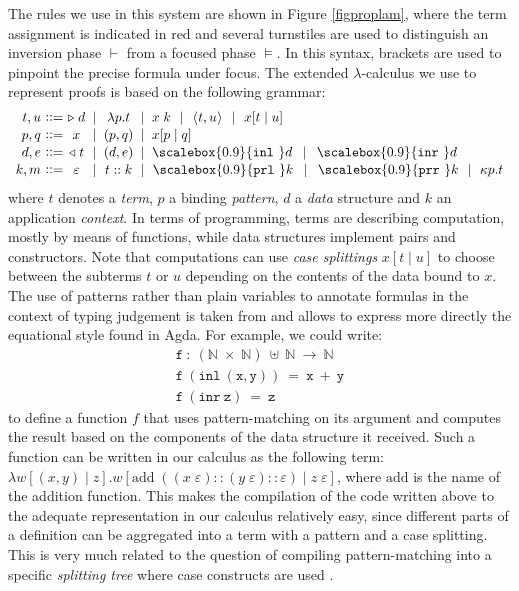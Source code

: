 \documentclass[creativecommons]{eptcs/eptcs}
\newcommand{\grdef}[0]{\mathrel{\raise.5pt\hbox{$\mathop{::}$}{=}}}
\newcommand{\mmid}{\:\mid\:}
\newcommand{\pr}[1]{\langle\hspace*{0.1ex}#1\hspace*{0.1ex}\rangle}
\newcommand{\don}[0]{\mathord{\triangleright\;}}
\newcommand{\nod}[0]{\mathord{\triangleleft\;}}
\newcommand{\els}[0]{\varepsilon}
\newcommand{\inl}[0]{\mathord{\scalebox{0.9}{\texttt{inl\,\,}}}\xspace}
\newcommand{\inr}[0]{\mathord{\scalebox{0.9}{\texttt{inr\,\,}}}\xspace}
\newcommand{\prl}[0]{\mathord{\scalebox{0.9}{\texttt{prl\,\,}}}\xspace}
\newcommand{\prr}[0]{\mathord{\scalebox{0.9}{\texttt{prr\,\,}}}\xspace}
\newcommand{\spt}[3]{#1[#2 \mid #3]}
\newcommand{\imp}[0]{\rightarrow\xspace}
\begin{document}
The rules we use in this system are shown in Figure \ref{figproplam}, where
the term assignment is indicated in red and several turnstiles are used to
distinguish an inversion phase $\vdash$ from a focused phase $\vDash$. In this
syntax, brackets are used to pinpoint the precise formula under focus. The
extended $\lambda$-calculus we use to represent proofs is based on the
following grammar:
$$\begin{array}{r@{~\grdef~}c@{~\mmid~}c@{~\mmid~}l}
  t,u & \don d & \lambda p.t & x\;k \,\mmid\, \pr{t,u}
    \,\mmid\, \spt{x}{t}{u} \\[0.1em]
  p,q & x & (p,q) & \spt{x}{p}{q} \\[0.1em]
  d,e & \nod t & (d,e) & \inl d \;\mmid\; \inr d \\[0.1em]
  k,m & \els & t::k & \hspace*{0.5pt}\prl k \;\mmid\; \prr k \,\mmid\, \kappa p.t \\
\end{array}$$
where $t$ denotes a \emph{term}, $p$ a binding \emph{pattern}, $d$ a \emph{data}
structure and $k$ an application \emph{context}. In terms of programming, terms are
describing computation, mostly by means of functions, while data structures
implement pairs and constructors. Note that computations can use \emph{case
splittings} $\spt{x}{t}{u}$ to choose between the subterms $t$ or $u$ depending
on the contents of the data bound to $x$. The use of patterns rather than plain
variables to annotate formulas in the context of typing judgement is taken
from \cite{cerrito:kesner:99:patcut} and allows to express more directly the
equational style found in Agda. For example, we could write:
$$\begin{array}{l}
  \mathtt{f~:~(\mathbb{N}\;\times\;\mathbb{N})~\uplus~\mathbb{N}~\imp~\mathbb{N}} \\
  \mathtt{f~(inl~(x,y))~=~x~+~y} \\
  \mathtt{f~(inr~z)~=~z}
\end{array}$$
to define a function $f$ that uses pattern-matching on its argument and
computes the result based on the components of the data structure it
received. Such a function can be written in our calculus as the following
term: $\lambda \spt{w}{(x,y)}{z}.
\spt{w}{\mathrm{add}\;((x\;\els)::(y\;\els)::\els)}{z\;\els}$,
where $\mathrm{add}$ is the name of the addition function. This makes
the compilation of the code written above to the adequate representation
in our calculus relatively easy, since different parts of a definition
can be aggregated into a term with a pattern and a case splitting. This
is very much related to the question of compiling pattern-matching into
a specific \emph{splitting tree} where case constructs are used
\cite{augustsson:85:compat}.
\end{document}
